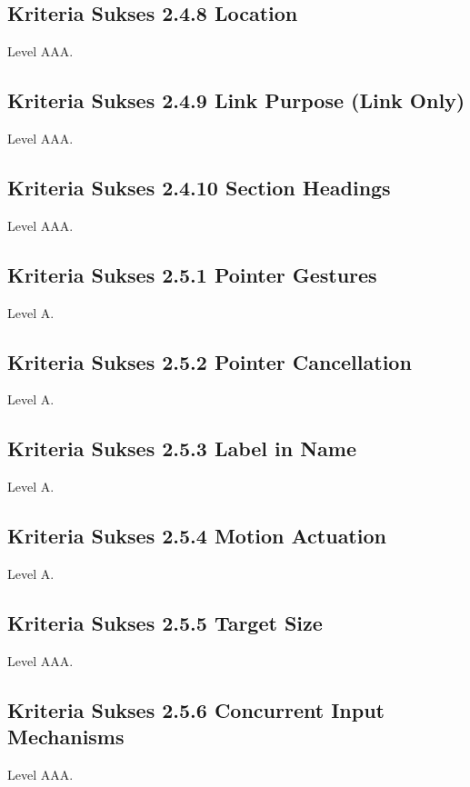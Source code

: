 \subsection{Kriteria Sukses 2.4.8 Location}
\label{sec:kriteria_2.4.8}
Level AAA.

\subsection{Kriteria Sukses 2.4.9 Link Purpose (Link Only)}
\label{sec:kriteria_2.4.9}
Level AAA.

\subsection{Kriteria Sukses 2.4.10 Section Headings}
\label{sec:kriteria_2.4.10}
Level AAA.

\subsection{Kriteria Sukses 2.5.1 Pointer Gestures}
\label{sec:kriteria_2.5.1}
Level A.

\subsection{Kriteria Sukses 2.5.2 Pointer Cancellation}
\label{sec:kriteria_2.5.2}
Level A.

\subsection{Kriteria Sukses 2.5.3 Label in Name}
\label{sec:kriteria_2.5.3}
Level A.

\subsection{Kriteria Sukses 2.5.4 Motion Actuation}
\label{sec:kriteria_2.5.4}
Level A.

\subsection{Kriteria Sukses 2.5.5 Target Size}
\label{sec:kriteria_2.5.5}
Level AAA.

\subsection{Kriteria Sukses 2.5.6 Concurrent Input Mechanisms}
\label{sec:kriteria_2.5.6}
Level AAA.

